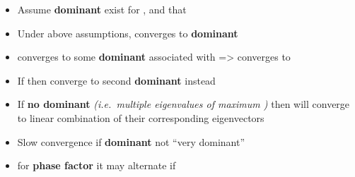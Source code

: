 \begin{itemize}
        \begin{itemize}

          \item
                Assume \textbf{dominant}  exist
                for , and that
          \item
                Under above assumptions,
                converges to \textbf{dominant }
          \item
                 converges to some
                \textbf{dominant}  associated with
                 =\textgreater{}
                 converges to
          \item
                If
                then
                converge to second \textbf{dominant}
                 instead
          \item
                If \textbf{no dominant \iMbox{\lambda}} \emph{(i.e.~multiple
                  eigenvalues of maximum \iMbox{|\lambda|})} then
                 will converge to linear
                combination of their corresponding eigenvectors
          \item
                Slow convergence if \textbf{dominant } not ``very
                dominant''
          \item
                for \textbf{phase factor}  it may
                alternate if 

                \begin{itemize}


\end{itemize}
\end{itemize}
\end{itemize}
